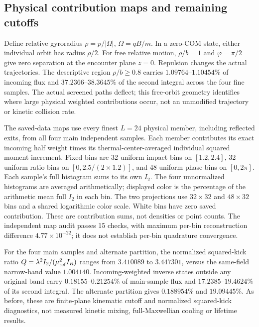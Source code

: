 \documentclass[11pt,letterpaper]{article}
\begin{document}
\subsection*{Physical contribution maps and remaining cutoffs}
Define relative gyroradius $\rho=p/|\Omega|$, $\Omega=qB/m$.
In a zero-COM state, either individual orbit has radius $\rho/2$.
For free relative motion, $\rho/b=1$ and $\varphi=\pi/2$ give zero
separation at the encounter plane $z=0$. Repulsion changes the actual
trajectories. The descriptive region
$\rho/b\geq0.8$ carries $1.09764$--$1.10454\%$ of incoming flux and
$37.2366$--$38.3645\%$ of the second integral across the four fine samples.
The actual screened paths deflect; this free-orbit geometry identifies
where large physical weighted contributions occur, not an unmodified
trajectory or kinetic collision rate.

The saved-data maps use every finest $L=24$ physical member, including
reflected exits, from all four main independent samples. Each member
contributes its exact incoming half weight times its thermal-center-averaged
individual squared moment increment. Fixed bins are 32 uniform impact
bins on $[1.2,2.4]$, 32 uniform ratio bins on $[0,2.5/(2\times1.2)]$,
and 48 uniform phase bins on $[0,2\pi]$. Each sample's full histogram sums
to its own $I_2$. The four unnormalized histograms are averaged
arithmetically; displayed color is the percentage of the arithmetic mean
full $I_2$ in each bin. The two projections use $32\times32$ and
$48\times32$ bins and a shared logarithmic color scale. White bins have
zero saved contribution. These are contribution sums, not densities or
point counts. The independent map audit passes 15 checks, with maximum
per-bin reconstruction difference $4.77\times10^{-22}$; it does not
establish per-bin quadrature convergence.

For the four main samples and alternate partition, the normalized
squared-kick ratio $Q=\lambda^2I_2/(\mu_{\rm ref}^2I_R)$ ranges from
$3.410089$ to $3.447301$, versus the same-field narrow-band value
$1.004140$. Incoming-weighted inverse states outside any original band
carry $0.18155$--$0.21254\%$ of main-sample flux and
$17.2385$--$19.4624\%$ of its second integral. The alternate partition
gives $0.188954\%$ and $19.09445\%$. As before, these are finite-plane
kinematic cutoff and normalized squared-kick diagnostics, not measured
kinetic mixing, full-Maxwellian cooling or lifetime results.
\end{document}
